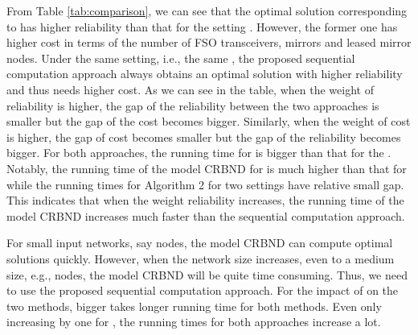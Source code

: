 \documentclass[onecolumn,11pt,draftclsnofoot]{IEEEtran}
\begin{document}
From Table \ref{tab:comparison}, we can see that the optimal solution corresponding to  has higher reliability than that for the setting .  However, the former one has higher cost in terms of the number of FSO transceivers, mirrors and leased mirror nodes. Under the same setting, i.e., the same , the proposed sequential computation approach always obtains an optimal solution with higher reliability and thus needs higher cost. As we can see in the table, when the weight of reliability is higher, the gap of the reliability between the two approaches is smaller but the gap of the cost becomes bigger. Similarly, when the weight of cost is higher, the gap of cost becomes smaller but the gap of the reliability becomes bigger. For both approaches, the running time for  is bigger than that for the . Notably, the running time of the model CRBND for  is much higher than that for  while the running times for Algorithm 2 for two settings have relative small gap. This indicates that when the weight reliability increases, the running time of the model CRBND increases much faster than the sequential computation approach.

For small input networks, say  nodes, the model CRBND can compute optimal solutions quickly. However, when the network size increases, even to a medium size, e.g.,  nodes, the model CRBND will be quite time consuming. Thus, we need to use the proposed sequential computation approach. For the impact of  on the two methods, bigger  takes longer running time for both methods. Even only increasing by one for , the running times for both approaches increase a lot.
\end{document}
